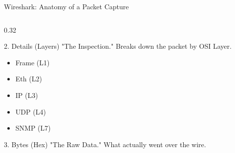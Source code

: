 \documentclass[aspectratio=169]{beamer}  %
\begin{document}
\begin{frame}[t,shrink=24]{Wireshark: Anatomy of a Packet Capture}
\begin{columns}[T]
\begin{column}{0.32\textwidth}
            \begin{block}{2. Details (Layers)}
                \footnotesize
                "The Inspection."
                Breaks down the packet by OSI Layer.
                \begin{itemize}
                    \item Frame (L1)
                    \item Eth (L2)
                    \item IP (L3)
                    \item UDP (L4)
                    \item SNMP (L7)
                \end{itemize}
            \end{block}
            \begin{block}{3. Bytes (Hex)}
                \footnotesize
                "The Raw Data."
                What actually went over the wire.
            \end{block}
        \end{column}
    \end{columns}
\end{frame}


\end{document}
